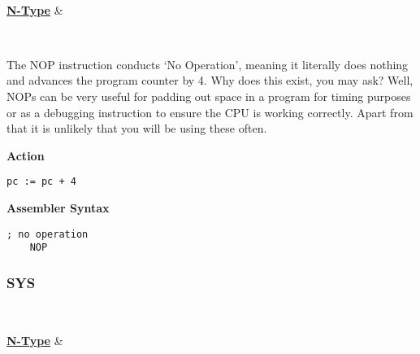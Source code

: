 \begin{center}
	\begin{bytefield}[leftcurly=., leftcurlyspace=0pt]{32}
		 \\
		\begin{leftwordgroup}{\hyperref[sec:n-type]{\textbf{N-Type}}}
		 & 
		\end{leftwordgroup}\\
	\end{bytefield}
\end{center}

The NOP instruction conducts `No Operation', meaning it literally does nothing and advances the program counter by 4.
Why does this exist, you may ask? Well, NOPs can be very useful for padding out space in a program for timing purposes or as a debugging instruction to ensure the CPU is working correctly.
Apart from that it is unlikely that you will be using these often.
 
\vspace{3ex}

\textbf{Action}
\begin{lstlisting}[frame=single]
	pc := pc + 4
\end{lstlisting}

\vspace{3ex}

\textbf{Assembler Syntax}
\begin{lstlisting}[frame=single]
	; no operation
	NOP
\end{lstlisting}

\subsubsection{SYS }\label{sec:SYS}

\vspace{3ex}

\begin{center}
	\begin{bytefield}[leftcurly=., leftcurlyspace=0pt]{32}
		 \\
		\begin{leftwordgroup}{\hyperref[sec:n-type]{\textbf{N-Type}}}
		 & 
		\end{leftwordgroup}\\
	\end{bytefield}
\end{center}

